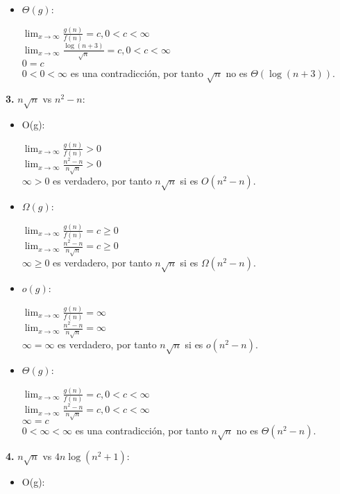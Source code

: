 \documentclass{article}
\begin{document}
\begin{enumerate}[label=\textbf{\alph*.}]
\begin{itemize}
      \item $\Theta(g)$:
      
      $\lim_{x\to\infty} \frac{g(n)}{f(n)}=c,0<c<\infty$\\
      $\lim_{x\to\infty} \frac{\log(n+3)}{\sqrt{n}}=c,0<c<\infty$\\
      $0=c$\\
	  $0<0<\infty$ es una contradicción, por tanto $\sqrt{n}$ no es $\Theta(\log(n+3))$.
    
  \end{itemize}  
  \textbf{3.} $n\sqrt{n}$ vs $n^2 -n$:
    \begin{itemize}
      \item O(g):
      
      $\lim_{x\to\infty} \frac{g(n)}{f(n)}>0$\\
      $\lim_{x\to\infty} \frac{n^2 -n}{n\sqrt{n}}>0$\\
      $\infty>0$ es verdadero, por tanto $n\sqrt{n}$ si es $O(n^2 -n)$.
    
      \item $\Omega(g)$:
      
      $\lim_{x\to\infty} \frac{g(n)}{f(n)}=c \geq 0$\\
      $\lim_{x\to\infty} \frac{n^2 -n}{n\sqrt{n}}=c \geq 0$\\
      $\infty \geq 0$ es verdadero, por tanto $n\sqrt{n}$ si es $\Omega(n^2 -n)$.
      
      \item $o(g)$:
      
      $\lim_{x\to\infty} \frac{g(n)}{f(n)}=\infty$\\
      $\lim_{x\to\infty} \frac{n^2 -n}{n\sqrt{n}}=\infty$\\
      $\infty=\infty$ es verdadero, por tanto $n\sqrt{n}$ si es $o(n^2 -n)$.
      
      \item $\Theta(g)$:
      
      $\lim_{x\to\infty} \frac{g(n)}{f(n)}=c,0<c<\infty$\\
      $\lim_{x\to\infty} \frac{n^2 -n}{n\sqrt{n}}=c,0<c<\infty$\\
      $\infty=c$\\
      $0<\infty<\infty$ es una contradicción, por tanto $n\sqrt{n}$ no es $\Theta(n^2 -n)$.
  \end{itemize}
  
  \textbf{4.} $n\sqrt{n}$ vs $4n \log(n^2 +1)$:
    \begin{itemize}
      \item O(g):
      

\end{itemize}
\end{enumerate}
\end{document}
